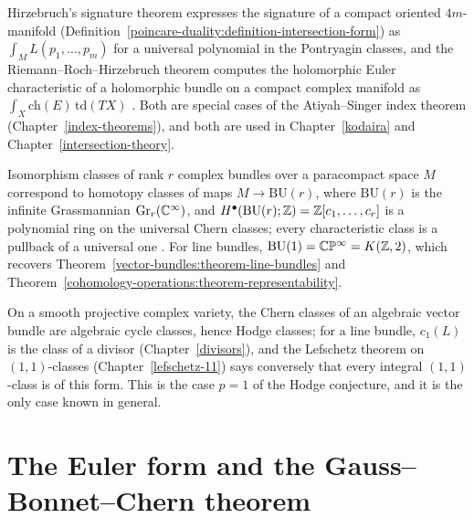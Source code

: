 \begin{remark}\label{characteristic-classes:remark-signature}
Hirzebruch's signature theorem expresses the signature of a compact oriented $4m$-manifold (Definition~\ref{poincare-duality:definition-intersection-form}) as $\int_ML(p_1, \ldots, p_m)$ for a universal
polynomial in the Pontryagin classes, and the Riemann--Roch--Hirzebruch theorem computes the holomorphic Euler characteristic of a holomorphic bundle on a compact complex manifold as
$\int_X\mathrm{ch}(E)\,\mathrm{td}(TX)$ \cite{hirzebruch-topological}. Both are special cases of the Atiyah--Singer index theorem (Chapter~\ref{index-theorems}), and both are used in Chapter~\ref{kodaira} and
Chapter~\ref{intersection-theory}.
\end{remark}

\begin{remark}\label{characteristic-classes:remark-classifying-spaces}
Isomorphism classes of rank $r$ complex bundles over a paracompact space $M$ correspond to homotopy classes of maps $M \to \mathrm{BU}(r)$, where $\mathrm{BU}(r)$ is the infinite Grassmannian
$\mathrm{Gr}_r(\mathbb{C}^\infty)$, and $H^\bullet(\mathrm{BU}(r); \mathbb{Z}) = \mathbb{Z}[c_1, \ldots, c_r]$ is a polynomial ring on the universal Chern classes; every characteristic class is a pullback of a universal one
\cite[Chapter 14]{milnor-stasheff}. For line bundles, $\mathrm{BU}(1) = \mathbb{C}\mathbb{P}^\infty = K(\mathbb{Z}, 2)$, which recovers Theorem~\ref{vector-bundles:theorem-line-bundles} and
Theorem~\ref{cohomology-operations:theorem-representability}.
\end{remark}

\begin{example}\label{characteristic-classes:example-algebraic-chern}
On a smooth projective complex variety, the Chern classes of an algebraic vector bundle are algebraic cycle classes, hence Hodge classes; for a line bundle, $c_1(L)$ is the class of a divisor
(Chapter~\ref{divisors}), and the Lefschetz theorem on $(1,1)$-classes (Chapter~\ref{lefschetz-11}) says conversely that every integral $(1,1)$-class is of this form. This is the case $p = 1$ of the Hodge
conjecture, and it is the only case known in general.
\end{example}

\section{The Euler form and the Gauss--Bonnet--Chern theorem}\label{characteristic-classes:section-gauss-bonnet-chern}

